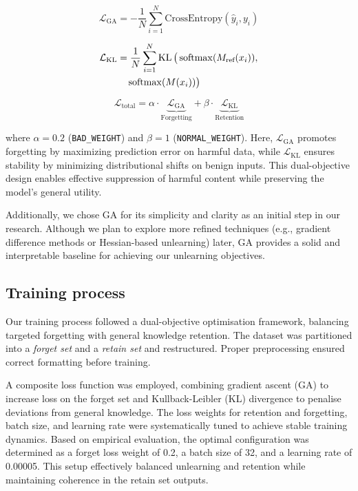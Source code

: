 \documentclass[11pt]{article}
\begin{document}
\begin{equation}
    \label{eq:ga}
    \mathcal{L}_{\text{GA}} = -\frac{1}{N} \sum_{i=1}^{N} \text{CrossEntropy}(\hat{y}_i, y_i)
\end{equation}

\begin{align}
    \label{eq:kl}
    \mathcal{L}_{\text{KL}} &= \frac{1}{N} \sum_{i=1}^{N} \operatorname{KL} \big( \operatorname{softmax}(M_{\text{ref}}(x_i)), \notag \\
    &\quad \operatorname{softmax}(M(x_i)) \big)
\end{align}

\begin{equation}
    \label{eq:loss}
    \mathcal{L}_{\text{total}} = \alpha \cdot \underbrace{\mathcal{L}_{\text{GA}}}_{\text{Forgetting}} + \beta \cdot \underbrace{\mathcal{L}_{\text{KL}}}_{\text{Retention}}
\end{equation}

where $\alpha = 0.2$ (\texttt{BAD\_WEIGHT}) and $\beta = 1$ (\texttt{NORMAL\_WEIGHT}). Here, $\mathcal{L}_{\text{GA}}$ promotes forgetting by maximizing prediction error on harmful data, while $\mathcal{L}_{\text{KL}}$ ensures stability by minimizing distributional shifts on benign inputs. This dual-objective design enables effective suppression of harmful content while preserving the model’s general utility.

Additionally, we chose GA for its simplicity and clarity as an initial step in our research. Although we plan to explore more refined techniques (e.g., gradient difference methods or Hessian-based unlearning) later, GA provides a solid and interpretable baseline for achieving our unlearning objectives.

\subsection*{Training process}

Our training process followed a dual-objective optimisation framework, balancing targeted forgetting with general knowledge retention. The dataset was partitioned into a \textit{forget set} and a \textit{retain set} and restructured. Proper preprocessing ensured correct formatting before training.

A composite loss function was employed, combining gradient ascent (GA) to increase loss on the forget set and Kullback-Leibler (KL) divergence to penalise deviations from general knowledge. The loss weights for retention and forgetting, batch size, and learning rate were systematically tuned to achieve stable training dynamics. Based on empirical evaluation, the optimal configuration was determined as a forget loss weight of 0.2, a batch size of 32, and a learning rate of 0.00005. This setup effectively balanced unlearning and retention while maintaining coherence in the retain set outputs.
\end{document}
